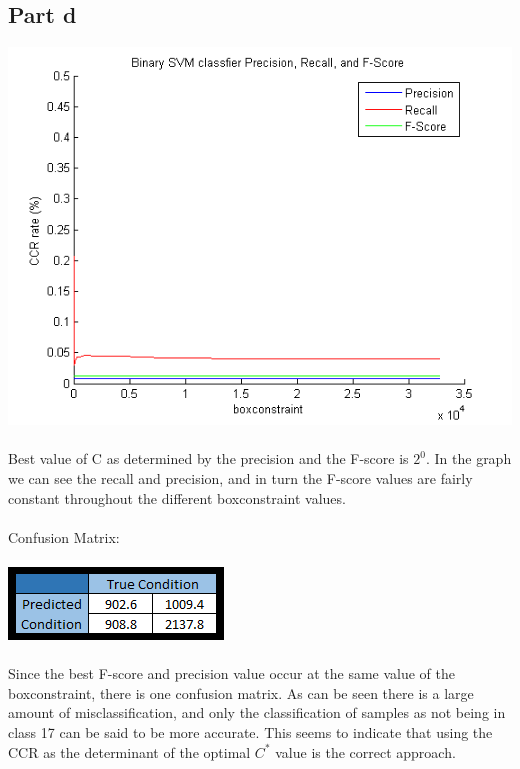 \documentclass[paper=a4, fontsize=11pt]{scrartcl} %
\numberwithin{equation}{section} %
\numberwithin{figure}{section} %
\numberwithin{table}{section} %
\begin{document}
	\subsection{Part d}
	\includegraphics[scale=0.8]{part_d_CV_CCR}
	\\\\
	Best value of C as determined by the precision and the F-score is $2^0$. In the graph we can see the recall and precision, and in turn the F-score values are fairly constant throughout the different boxconstraint values.
	\\\\
	Confusion Matrix:
	\\\\
	\hspace*{4cm}\includegraphics{part_d_confusion_matrix}
	\\\\
	Since the best F-score and precision value occur at the same value of the boxconstraint, there is one confusion matrix. As can be seen there is a large amount of misclassification, and only the classification of samples as not being in class 17 can be said to be more accurate. This seems to indicate that using the CCR as the determinant of the optimal $C^*$ value is the correct approach.
	
	\newpage
	
\end{document}
